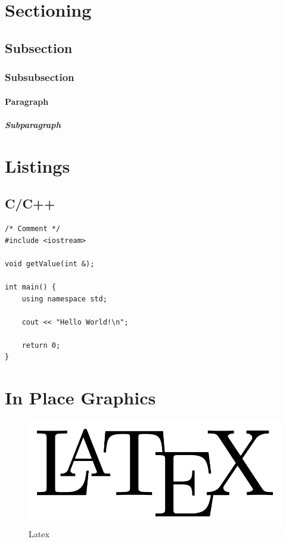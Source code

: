 \documentclass{swddoc}
\begin{document}
\tableofcontents

\listoffigures

\lstlistoflistings

\section{Sectioning}
\subsection{Subsection}
\subsubsection{Subsubsection}
\paragraph{Paragraph}
\subparagraph{Subparagraph}

\section{Listings}

\subsection{C/C++}

\begin{lstlisting}[style=swd_cpp_lst_style, caption=Hello World]
/* Comment */
#include <iostream>

void getValue(int &);

int main() {
	using namespace std;

	cout << "Hello World!\n";
	
	return 0;
}
\end{lstlisting}

\section{In Place Graphics}
\begin{figure}[H]
\includegraphics[scale=0.3]{img/LaTeX-logo.png} 
\centering
\caption{Latex}
\end{figure}
\end{document}
